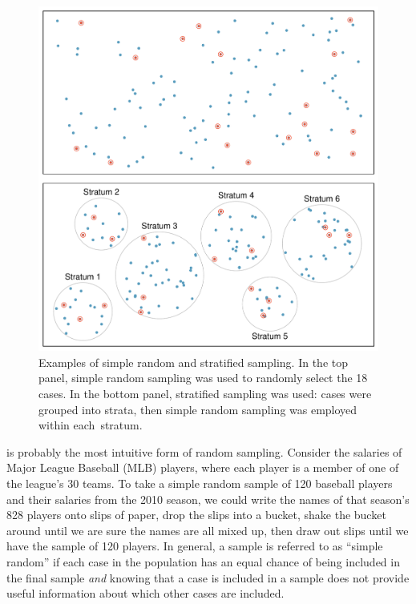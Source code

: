 \begin{figure}
\centering
\includegraphics[width=\textwidth]{ch_intro_to_data/figures/samplingMethodsFigure/simple_stratified}
\caption{Examples of simple random and stratified sampling. In the top panel, simple random sampling was used to randomly select the 18 cases. In the bottom panel, stratified sampling was used: cases were grouped into strata, then simple random sampling was employed within \mbox{each stratum}.}
\label{simple_stratified}
\end{figure}

 is probably the most intuitive form of random sampling. Consider the salaries of Major League Baseball (MLB) players, where each player is a member of one of the league's 30 teams. To take a simple random sample of 120 baseball players and their salaries from the 2010 season, we could write the names of that season's 828 players onto slips of paper, drop the slips into a bucket, shake the bucket around until we are sure the names are all mixed up, then draw out slips until we have the sample of 120 players. In general, a sample is referred to as ``simple random'' if each case in the population has an equal chance of being included in the final sample \emph{and} knowing that a case is included in a sample does not provide useful information about which other cases are included.

